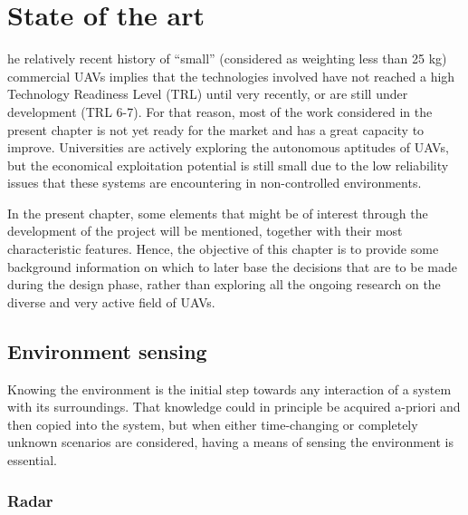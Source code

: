
\let\textcircled=\pgftextcircled
\chapter{State of the art} \label{chap:sota}

he relatively recent history of ``small'' (considered as weighting less than 25 kg) commercial UAVs implies that the technologies involved have not reached a high Technology Readiness Level (TRL) \cite{assistantsecretaryofdefenseforresearchandengineering2011} until very recently, or are still under development (TRL 6-7).
For that reason, most of the work considered in the present chapter is not yet ready for the market and has a great capacity to improve.
Universities are actively exploring the autonomous aptitudes of UAVs, but the economical exploitation potential is still small due to the low reliability issues that these systems are encountering in non-controlled environments.


In the present chapter, some elements that might be of interest through the development of the project will be mentioned, together with their most characteristic features.
Hence, the objective of this chapter is to provide some background information on which to later base the decisions that are to be made during the design phase, rather than exploring all the ongoing research on the diverse and very active field of UAVs.


\section{Environment sensing} \label{sec:sensing}

Knowing the environment is the initial step towards any interaction of a system with its surroundings.
That knowledge could in principle be acquired a-priori and then copied into the system, but when either time-changing or completely unknown scenarios are considered, having a means of sensing the environment is essential.

\subsection{Radar}

